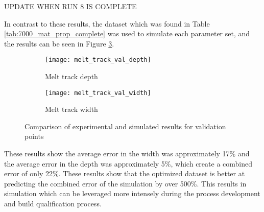 UPDATE WHEN RUN 8 IS COMPLETE

In contrast to these results, the dataset which was found in Table \ref{tab:7000_mat_prop_complete} was used to simulate each parameter set, and the results can be seen in Figure \ref{fig:melt_track_val}.
\begin{figure}[!htb]\centering
	\begin{subfigure}[c]{0.45\textwidth}\centering
	\texttt{[image: melt\_track\_val\_depth]}
	\caption{Melt track depth}
	\label{fig:melt_track_val_depth}
	\end{subfigure}\hfill{}
		\begin{subfigure}[c]{0.45\textwidth}\centering
		\texttt{[image: melt\_track\_val\_width]}
		\caption{Melt track width}
		\label{fig:melt_track_val_width}
		\end{subfigure}
	\caption{Comparison of experimental and simulated results for validation points}
	\label{fig:melt_track_val}
\end{figure}
These results show the average error in the width was approximately 17\% and the average error in the depth was approximately 5\%, which create a combined error of only 22\%.  These results show that the optimized dataset is better at predicting the combined error of the simulation by over 500\%.  This results in simulation which can be leveraged more intensely during the process development and build qualification process.  